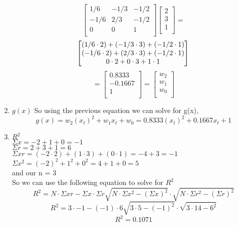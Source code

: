 \documentclass{article}
\begin{document}
\begin{enumerate}[label=\alph*)]
\[\begin{bmatrix}
1/6 & -1/3 & -1/2 \\
-1/6 & 2/3 & -1/2 \\
0 & 0 & 1 \\
\end{bmatrix}
\begin{bmatrix}
2 \\
3 \\
1 \\
\end{bmatrix}=
\]
\[
\begin{bmatrix}
    (1/6 \cdot 2) + (-1/3 \cdot 3) + (-1/2 \cdot 1) \\
    (-1/6 \cdot 2) + (2/3 \cdot 3) + (-1/2 \cdot 1) \\
    0 \cdot 2 + 0 \cdot 3 + 1 \cdot 1 \\
\end{bmatrix} \\
\] 
\[
    =\begin{bmatrix}
        0.8333 \\
        -0.1667 \\
        1 \\
        \end{bmatrix}= \begin{bmatrix}
            w_{2} \\
            w_{1} \\
            w_{0} \\
            \end{bmatrix}
\]
\item $g(x)$
So using the previous equation we can solve for g(x),
\[
g(x) = w_{2}(x_t)^2 + w_{1}x_t + w_{0} = 0.8333(x_t)^2 + 0.1667x_t + 1
\]
\item $R^2$
\\ $\Sigma x = -2+1+0 = -1$
\\ $\Sigma r = 2+3+1 = 6$
\\ $\Sigma xr = (-2 \cdot 2) + (1 \cdot 3) + (0 \cdot 1) = -4 + 3 = -1$
\\ $\Sigma x^2 = (-2)^2 + 1^2 + 0^2 = 4 + 1 + 0 = 5$
\\ and our n = 3
\\ So we can use the following equation to solve for $R^2$
\[
    R^2 = N \cdot \Sigma xr - \Sigma x \cdot \Sigma r  \sqrt{N \cdot \Sigma x^2 - (\Sigma x)^2} \cdot \sqrt{N \cdot \Sigma r^2 - (\Sigma r)^2}
    \]
    \[
    R^2 = 3 \cdot -1 - (-1) \cdot 6 \sqrt{3 \cdot 5 - (-1)^2} \cdot \sqrt{3 \cdot 14 - 6^2}
    \]
    \[
        R^2 = 0.1071
    \]

\end{enumerate}
\end{document}

